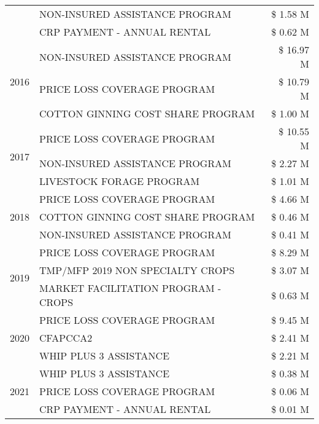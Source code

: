 \begin{tabular}{llr}
 & NON-INSURED ASSISTANCE PROGRAM & \$ 1.58 M \\
 & CRP PAYMENT - ANNUAL RENTAL & \$ 0.62 M \\
\cline{1-3}
\multirow[t]{3}{*}{2016} & NON-INSURED ASSISTANCE PROGRAM                & \$ 16.97 M \\
 & PRICE LOSS COVERAGE PROGRAM                   & \$ 10.79 M \\
 & COTTON GINNING COST SHARE PROGRAM             & \$ 1.00 M \\
\cline{1-3}
\multirow[t]{3}{*}{2017} & PRICE LOSS COVERAGE PROGRAM & \$ 10.55 M \\
 & NON-INSURED ASSISTANCE PROGRAM & \$ 2.27 M \\
 & LIVESTOCK FORAGE PROGRAM & \$ 1.01 M \\
\cline{1-3}
\multirow[t]{3}{*}{2018} & PRICE LOSS COVERAGE PROGRAM & \$ 4.66 M \\
 & COTTON GINNING COST SHARE PROGRAM & \$ 0.46 M \\
 & NON-INSURED ASSISTANCE PROGRAM & \$ 0.41 M \\
\cline{1-3}
\multirow[t]{3}{*}{2019} & PRICE LOSS COVERAGE PROGRAM & \$ 8.29 M \\
 & TMP/MFP 2019 NON SPECIALTY CROPS & \$ 3.07 M \\
 & MARKET FACILITATION PROGRAM - CROPS & \$ 0.63 M \\
\cline{1-3}
\multirow[t]{3}{*}{2020} & PRICE LOSS COVERAGE PROGRAM & \$ 9.45 M \\
 & CFAPCCA2 & \$ 2.41 M \\
 & WHIP PLUS 3 ASSISTANCE & \$ 2.21 M \\
\cline{1-3}
\multirow[t]{3}{*}{2021} & WHIP PLUS 3 ASSISTANCE & \$ 0.38 M \\
 & PRICE LOSS COVERAGE PROGRAM & \$ 0.06 M \\
 & CRP PAYMENT - ANNUAL RENTAL & \$ 0.01 M \\
\cline{1-3}
\bottomrule
\end{tabular}
